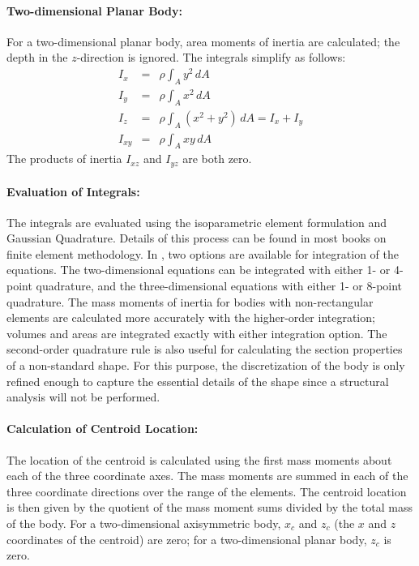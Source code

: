 \paragraph{Two-dimensional Planar Body:}
For a two-dimensional planar body, area moments of inertia are
calculated; the depth in the $z$-direction is ignored. The integrals
simplify as follows: 
\begin{eqnarray}
 I_x    &=& \rho\int_A y^2\,dA                   \\
 I_y    &=& \rho\int_A x^2\,dA                   \\
 I_z    &=& \rho\int_A \left(x^2 + y^2\right)\,dA = I_x + I_y \\
 I_{xy} &=& \rho\int_A xy\,dA                    
\end{eqnarray}
The products of inertia $I_{xz}$ and $I_{yz}$ are both zero.

\paragraph*{Evaluation of Integrals:} The integrals are evaluated using
the isoparametric element formulation and Gaussian Quadrature. Details
of this process can be found in most books on finite element
methodology.  In \numbers, two options are available for integration of
the equations.  The two-dimensional equations can be integrated with
either 1- or 4-point quadrature, and the three-dimensional equations
with either 1- or 8-point quadrature.  The mass moments of inertia for
bodies with non-rectangular elements are calculated more accurately with
the higher-order integration; volumes and areas are integrated exactly
with either integration option.  The second-order quadrature rule is
also useful for calculating the section properties of a non-standard
shape.  For this purpose, the discretization of the body is only refined
enough to capture the essential details of the shape since a structural
analysis will not be performed. 

\paragraph{Calculation of Centroid Location:} The location of the
centroid is calculated using the first mass moments about each of the
three coordinate axes.  The mass moments are summed in each of the three
coordinate directions over the range of the elements.  The centroid
location is then given by the quotient of the mass moment sums divided
by the total mass of the body.  For a two-dimensional axisymmetric body,
$x_c$ and $z_c$ (the $x$ and $z$ coordinates of the centroid) are zero;
for a two-dimensional planar body, $z_c$ is zero. 
  
